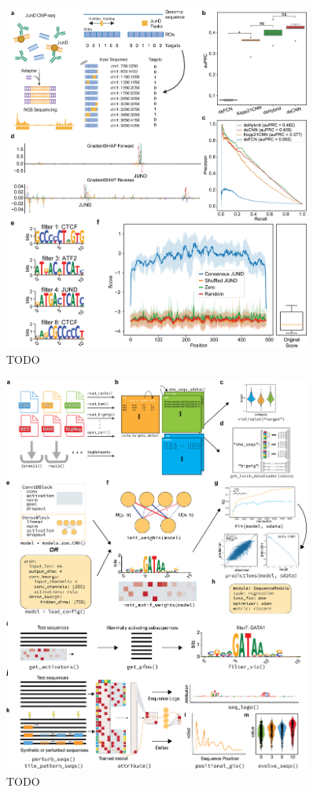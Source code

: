\begin{figure}[p]
    \centering
    \includegraphics[width=0.9\textwidth, height=0.745\textheight]{1_figures-and-files/extended_data_figure2.png}
    \caption[TODO]{TODO  
    }
    \label{fig:4 Extended Data Figure 2}
\end{figure}

\begin{figure}[p]
    \centering
    \includegraphics[width=0.9\textwidth, height=0.745\textheight]{1_figures-and-files/extended_data_figure3.png}
    \caption[TODO]{TODO  
    }
    \label{fig:5 Extended Data Figure 3}
\end{figure}

